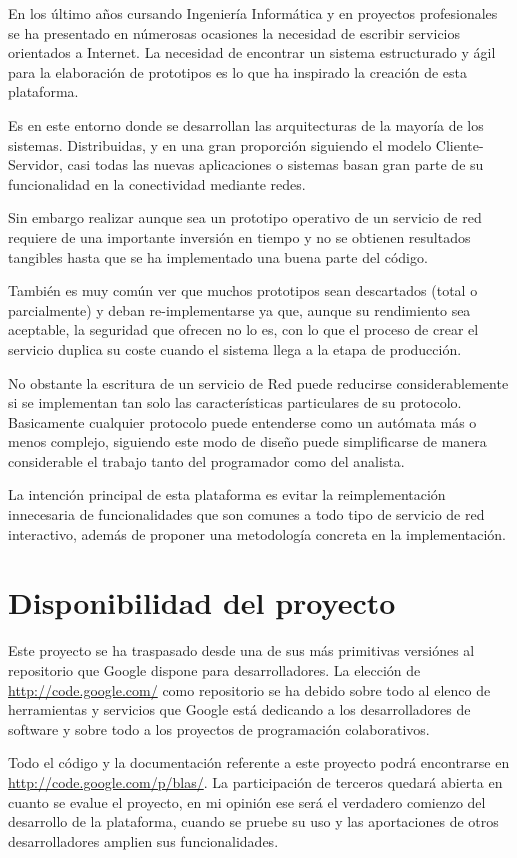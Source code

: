 \documentclass[a4paper,spanish,12pt]{book}
\begin{document}
En los último años cursando Ingeniería Informática y en proyectos profesionales se ha presentado en númerosas ocasiones la necesidad de escribir servicios orientados a Internet. La necesidad de encontrar un sistema estructurado y ágil para la elaboración de prototipos es lo que ha inspirado la creación de esta plataforma.

Es en este entorno donde se desarrollan las arquitecturas de la mayor\'ia de los sistemas. Distribuidas, y en una gran proporci\'on siguiendo el modelo Cliente-Servidor, casi todas las nuevas aplicaciones o sistemas basan gran parte de su funcionalidad en la conectividad mediante redes. 

Sin embargo realizar aunque sea un prototipo operativo de un servicio de red requiere de una importante inversión en tiempo y no se obtienen resultados tangibles hasta que se ha implementado una buena parte del código.

Tambi\'en es muy com\'un ver que muchos prototipos sean descartados (total o parcialmente) y deban re-implementarse ya que, aunque su rendimiento sea aceptable, la seguridad que ofrecen no lo es, con lo que el proceso de crear el servicio duplica su coste cuando el sistema llega a la etapa de producci\'on.

No obstante la escritura de un servicio de Red puede reducirse considerablemente si se implementan tan solo las características particulares de su protocolo. Basicamente cualquier protocolo puede entenderse como un autómata m\'as o menos complejo, siguiendo este modo de diseño puede simplificarse de manera considerable el trabajo tanto del programador como del analista.

La intención principal de esta plataforma es evitar la reimplementación innecesaria de funcionalidades que son comunes a todo tipo de servicio de red interactivo, además de proponer una metodología concreta en la implementación.
\section{Disponibilidad del proyecto}
Este proyecto se ha traspasado desde una de sus más primitivas versiónes al repositorio que Google dispone para desarrolladores. La elección de \url{http://code.google.com/} como repositorio se ha debido sobre todo al elenco de herramientas y servicios que Google está dedicando a los desarrolladores de software y sobre todo a los proyectos de programación colaborativos.

Todo el código y la documentación referente a este proyecto podrá encontrarse en \url{http://code.google.com/p/blas/}. La participación de terceros quedará abierta en cuanto se evalue el proyecto, en mi opinión ese será el verdadero comienzo del desarrollo de la plataforma, cuando se pruebe su uso y las aportaciones de otros desarrolladores amplien sus funcionalidades.
\end{document}
